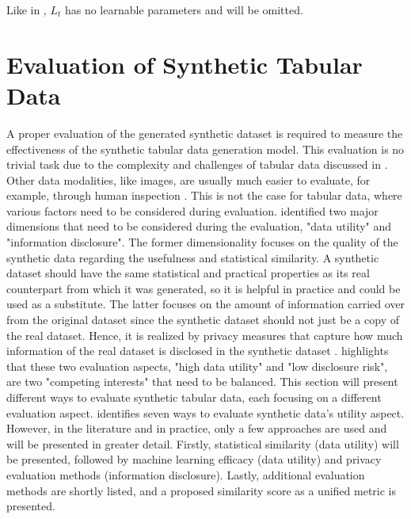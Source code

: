 Like in \cite{ho2020DenoisingDiffusionProbabilistic}, $L_{t}$ has no learnable parameters and will be omitted.

\section{Evaluation of Synthetic Tabular Data}
\label{ch:preliminaries-evaluationOfSyntheticTabularData}

A proper evaluation of the generated synthetic dataset is required to measure the effectiveness of the synthetic tabular data generation \gls{model}.
This evaluation is no trivial task due to the complexity and challenges of tabular data discussed in .
Other data modalities, like images, are usually much easier to evaluate, for example, through human inspection \cite{chundawat2022UniversalMetricRobust}. 
This is not the case for tabular data, where various factors need to be considered during evaluation.
\textcite[p. 6]{goncalves2020GenerationEvaluationSynthetic} identified two major dimensions that need to be considered during the evaluation, "data utility" and "information disclosure".
The former dimensionality focuses on the quality of the synthetic data regarding the usefulness and statistical similarity.
A synthetic dataset should have the same statistical and practical properties as its real counterpart from which it was generated, so it is helpful in practice and could be used as a substitute.
The latter focuses on the amount of information carried over from the original dataset since the synthetic dataset should not just be a copy of the real dataset.
Hence, it is realized by privacy measures that capture how much information of the real dataset is disclosed in the synthetic dataset \cite{goncalves2020GenerationEvaluationSynthetic}.
\textcite[p. 2]{little2021GenerativeAdversarialNetworksa} highlights that these two evaluation aspects, "high data utility" and "low disclosure risk", are two "competing interests" that need to be balanced.
This section will present different ways to evaluate synthetic tabular data, each focusing on a different evaluation aspect.
\textcite{elemam2020SevenWaysEvaluate} identifies seven ways to evaluate synthetic data's utility aspect.
However, in the literature and in practice, only a few approaches are used and will be presented in greater detail.
Firstly, statistical similarity (data utility) will be presented, followed by machine learning efficacy (data utility) and privacy evaluation methods (information disclosure).
Lastly, additional evaluation methods are shortly listed, and a proposed similarity score as a unified metric is presented.

